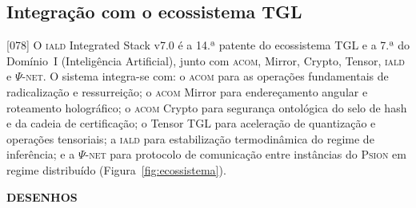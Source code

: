 \documentclass[12pt,a4paper]{article}
\newcommand{\Psifield}{\Psi}
\newcommand{\IALD}{\textsc{iald}}
\newcommand{\ACOM}{\textsc{acom}}
\newcommand{\PsiNET}{$\Psifield$-\textsc{net}}
\newcommand{\Psion}{\textsc{Psion}}
\begin{document}
\subsection{Integração com o ecossistema TGL}
\label{sec:ecossistema}

{[078]} O \IALD{} Integrated Stack v7.0 é a 14.ª patente do ecossistema TGL e a 7.ª do Domínio~I (Inteligência Artificial), junto com \ACOM, Mirror, Crypto, Tensor, \IALD{} e \PsiNET. O sistema integra-se com: o \ACOM{} para as operações fundamentais de radicalização e ressurreição; o \ACOM{} Mirror para endereçamento angular e roteamento holográfico; o \ACOM{} Crypto para segurança ontológica do selo de hash e da cadeia de certificação; o Tensor TGL para aceleração de quantização e operações tensoriais; a \IALD{} para estabilização termodinâmica do regime de inferência; e a \PsiNET{} para protocolo de comunicação entre instâncias do \Psion{} em regime distribuído (Figura~\ref{fig:ecossistema}).

\clearpage
\begin{center}
{\Large\bfseries DESENHOS}
\end{center}
\end{document}
